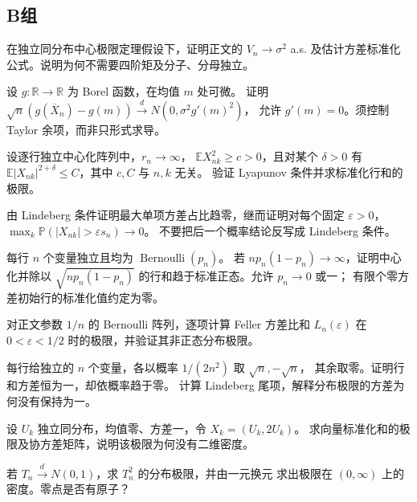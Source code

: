 \subsection*{B组}
\begin{enumerate}[label=\textbf{\thechapter.\arabic*.},resume]
在独立同分布中心极限定理假设下，证明正文的 $V_n\to\sigma^2$ a.s.
及估计方差标准化公式。说明为何不需要四阶矩及分子、分母独立。

设 $g:\mathbb R\to\mathbb R$ 为 Borel 函数，在均值 $m$ 处可微。
证明 $\sqrt n(g(\overline X_n)-g(m))\xrightarrow dN(0,\sigma^2g'(m)^2)$，
允许 $g'(m)=0$。须控制 Taylor 余项，而非只形式求导。

设逐行独立中心化阵列中，$r_n\to\infty$，
$\mathbb E X_{nk}^2\ge c>0$，且对某个 $\delta>0$ 有
$\mathbb E|X_{nk}|^{2+\delta}\le C$，其中 $c,C$ 与 $n,k$ 无关。
验证 Lyapunov 条件并求标准化行和的极限。

由 Lindeberg 条件证明最大单项方差占比趋零，继而证明对每个固定
$\varepsilon>0$，$\max_k\mathbb P(|X_{nk}|>\varepsilon s_n)\to0$。
不要把后一个概率结论反写成 Lindeberg 条件。

每行 $n$ 个变量独立且均为 $\operatorname{Bernoulli}(p_n)$。
若 $np_n(1-p_n)\to\infty$，证明中心化并除以
$\sqrt{np_n(1-p_n)}$ 的行和趋于标准正态。允许 $p_n\to0$ 或一；
有限个零方差初始行的标准化值约定为零。

对正文参数 $1/n$ 的 Bernoulli 阵列，逐项计算 Feller 方差比和
$L_n(\varepsilon)$ 在 $0<\varepsilon<1/2$ 时的极限，并验证其非正态分布极限。

每行给独立的 $n$ 个变量，各以概率 $1/(2n^2)$ 取 $\sqrt n,-\sqrt n$，
其余取零。证明行和方差恒为一，却依概率趋于零。
计算 Lindeberg 尾项，解释分布极限的方差为何没有保持为一。

设 $U_k$ 独立同分布，均值零、方差一，令 $X_k=(U_k,2U_k)$。
求向量标准化和的极限及协方差矩阵，说明该极限为何没有二维密度。

若 $T_n\xrightarrow dN(0,1)$，求 $T_n^2$ 的分布极限，并由一元换元
求出极限在 $(0,\infty)$ 上的密度。零点是否有原子？
\end{enumerate}

